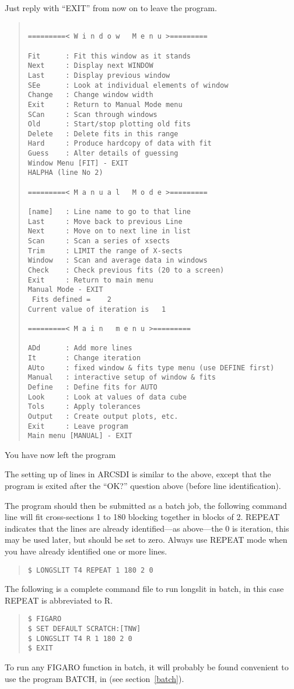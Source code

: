 Just reply with ``EXIT'' from now on to leave the program.
\begin{quote}\begin{verbatim}
 
=========< W i n d o w   M e n u >=========
 
Fit      : Fit this window as it stands
Next     : Display next WINDOW
Last     : Display previous window
SEe      : Look at individual elements of window
Change   : Change window width
Exit     : Return to Manual Mode menu
SCan     : Scan through windows
Old      : Start/stop plotting old fits
Delete   : Delete fits in this range
Hard     : Produce hardcopy of data with fit
Guess    : Alter details of guessing
Window Menu [FIT] - EXIT
HALPHA (line No 2)

=========< M a n u a l   M o d e >=========
 
[name]   : Line name to go to that line
Last     : Move back to previous Line
Next     : Move on to next line in list
Scan     : Scan a series of xsects
Trim     : LIMIT the range of X-sects
Window   : Scan and average data in windows
Check    : Check previous fits (20 to a screen)
Exit     : Return to main menu
Manual Mode - EXIT
 Fits defined =    2
Current value of iteration is   1
 
=========< M a i n   m e n u >=========

ADd      : Add more lines
It       : Change iteration
AUto     : fixed window & fits type menu (use DEFINE first)
Manual   : interactive setup of window & fits
Define   : Define fits for AUTO
Look     : Look at values of data cube
Tols     : Apply tolerances
Output   : Create output plots, etc.
Exit     : Leave program
Main menu [MANUAL] - EXIT
\end{verbatim}\end{quote}

You have now left the program

 The setting up of lines in ARCSDI is similar to the above, except that
the program is exited after the ``OK?'' question above (before line
identification).

 The program should then be submitted as a batch job, the following
command line will fit cross-sections 1 to 180 blocking together in
blocks of 2.
REPEAT indicates that the lines are already identified---as above---the
0 is iteration, this may be used later, but should be set to zero.
Always use REPEAT mode when you have already identified one or more
lines.
\begin{quote}\begin{verbatim}
$ LONGSLIT T4 REPEAT 1 180 2 0
\end{verbatim}\end{quote}
The following is a complete command file to run longslit in batch,
in this case REPEAT is abbreviated to R.
\begin{quote}\begin{verbatim}
$ FIGARO
$ SET DEFAULT SCRATCH:[TNW]
$ LONGSLIT T4 R 1 180 2 0
$ EXIT
\end{verbatim}\end{quote}
To run any FIGARO function in batch, it will probably be found
convenient to use the program BATCH, in (see section~\ref{batch}).

